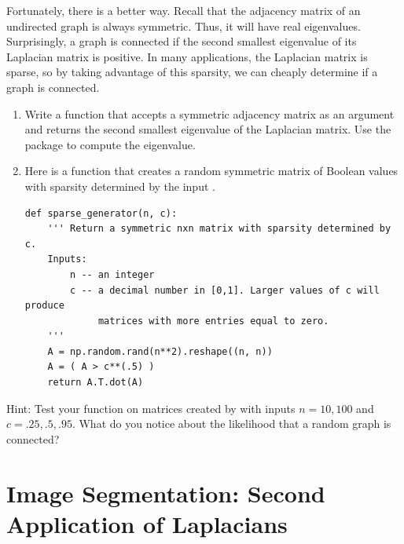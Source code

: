 Fortunately, there is a better way.
Recall that the adjacency matrix of an undirected graph is always symmetric. 
Thus, it will have real eigenvalues. 
Surprisingly, a graph is connected if the second smallest eigenvalue of its Laplacian matrix is positive.
In many applications, the Laplacian matrix is sparse, so by taking advantage of this sparsity, we can cheaply determine if a graph is connected.

\begin{problem}
\leavevmode
\begin{enumerate}
\item Write a function that accepts a symmetric adjacency matrix as an argument and returns the second smallest eigenvalue of the Laplacian matrix.
Use the  package to compute the eigenvalue.

\item Here is a function that creates a random symmetric matrix of Boolean values with sparsity determined by the input .
\begin{lstlisting}
def sparse_generator(n, c):
    ''' Return a symmetric nxn matrix with sparsity determined by c.
    Inputs:
        n -- an integer
        c -- a decimal number in [0,1]. Larger values of c will produce
             matrices with more entries equal to zero.
    '''
    A = np.random.rand(n**2).reshape((n, n))
    A = ( A > c**(.5) )
    return A.T.dot(A)
\end{lstlisting}
\end{enumerate}

Hint: Test your function on matrices created by  with inputs $n = 10, 100$ and $c = .25, .5, .95$. 
What do you notice about the likelihood that a random graph is connected?
\end{problem}


\section*{Image Segmentation: Second Application of Laplacians}

